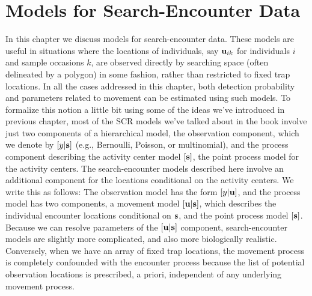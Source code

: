 \chapter{Models for  Search-Encounter Data}
\label{chapt.search-encounter}

\vspace{0.3cm}



In this chapter we discuss models for search-encounter data. These
models are useful in situations where the locations of individuals,
say ${\bf u}_{ik}$ for individuals $i$ and sample occasions $k$, are
observed directly by searching space (often delineated by a polygon)
in some fashion, rather than restricted to fixed trap locations.  In
all the cases addressed in this chapter, both detection probability
and parameters related to movement can be estimated using such models.
To formalize this notion a little bit using some of the ideas we've
introduced in previous chapter, most of the SCR models we've talked
about in the book involve just two components of a hierarchical model,
the observation component, which we denote by $[y|{\bf s}]$
(e.g., Bernoulli, Poisson, or multinomial), and the
process component describing the activity center model $[{\bf s}]$,
the point process model for the activity centers.
The search-encounter models described here involve an additional
component for the locations conditional on the activity centers. We
write this as follows: The observation model has the form $[y|{\bf
  u}]$, and the process model has two components, a movement model $[{\bf u}|{\bf s}]$,
which describes the individual encounter locations conditional on
${\bf s}$, 
and the point process model $[{\bf s}]$. Because we can resolve parameters of the $[{\bf
  u}|{\bf s}]$ component, search-encounter models are slightly more
complicated, and also more biologically realistic.  Conversely, when
we have an array of fixed trap locations, the movement process is
completely confounded with the encounter process because the list of
potential observation locations is prescribed, a priori, independent
of any underlying movement process.

